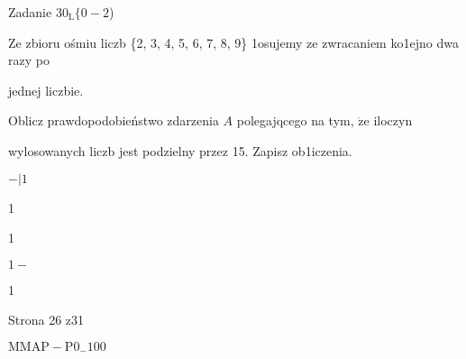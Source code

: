 \documentclass[a4paper,12pt]{article}
\begin{document}
Zadanie $30_{\mathrm{L}}\{0-2$)

Ze zbioru ośmiu liczb \{2, 3, 4, 5, 6, 7, 8, 9\} 1osujemy ze zwracaniem ko1ejno dwa razy po

jednej liczbie.

Oblicz prawdopodobieństwo zdarzenia $A$ polegajqcego na tym, $\dot{\mathrm{z}}\mathrm{e}$ iloczyn

wylosowanych liczb jest podzielny przez 15. Zapisz ob1iczenia.

$-|1$

1

1

$1-$

1

Strona 26 z31

$\mathrm{M}\mathrm{M}\mathrm{A}\mathrm{P}-\mathrm{P}0_{-}100$
\end{document}
